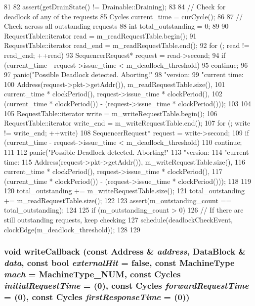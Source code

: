 \begin{DoxyCode}
81 {
82     assert(getDrainState() != Drainable::Draining);
83 
84     // Check for deadlock of any of the requests
85     Cycles current_time = curCycle();
86 
87     // Check across all outstanding requests
88     int total_outstanding = 0;
89 
90     RequestTable::iterator read = m_readRequestTable.begin();
91     RequestTable::iterator read_end = m_readRequestTable.end();
92     for (; read != read_end; ++read) {
93         SequencerRequest* request = read->second;
94         if (current_time - request->issue_time < m_deadlock_threshold)
95             continue;
96 
97         panic("Possible Deadlock detected. Aborting!\n"
98              "version: %
99              "current time: %
100              Address(request->pkt->getAddr()), m_readRequestTable.size(),
101               current_time * clockPeriod(), request->issue_time * clockPeriod(),
102               (current_time * clockPeriod()) - (request->issue_time * 
      clockPeriod()));
103     }
104 
105     RequestTable::iterator write = m_writeRequestTable.begin();
106     RequestTable::iterator write_end = m_writeRequestTable.end();
107     for (; write != write_end; ++write) {
108         SequencerRequest* request = write->second;
109         if (current_time - request->issue_time < m_deadlock_threshold)
110             continue;
111 
112         panic("Possible Deadlock detected. Aborting!\n"
113              "version: %
114              "current time: %
115              Address(request->pkt->getAddr()), m_writeRequestTable.size(),
116               current_time * clockPeriod(), request->issue_time * clockPeriod(),
117               (current_time * clockPeriod()) - (request->issue_time * 
      clockPeriod()));
118     }
119 
120     total_outstanding += m_writeRequestTable.size();
121     total_outstanding += m_readRequestTable.size();
122 
123     assert(m_outstanding_count == total_outstanding);
124 
125     if (m_outstanding_count > 0) {
126         // If there are still outstanding requests, keep checking
127         schedule(deadlockCheckEvent, clockEdge(m_deadlock_threshold));
128     }
129 }
\end{DoxyCode}
\hypertarget{classSequencer_a97f81494e28695a87ea2fdc0346ceb30}{
\subsubsection[{writeCallback}]{\setlength{\rightskip}{0pt plus 5cm}void writeCallback (const {\bf Address} \& {\em address}, \/  {\bf DataBlock} \& {\em data}, \/  const bool {\em externalHit} = {\ttfamily false}, \/  const MachineType {\em mach} = {\ttfamily MachineType\_\-NUM}, \/  const {\bf Cycles} {\em initialRequestTime} = {(0)}, \/  const {\bf Cycles} {\em forwardRequestTime} = {(0)}, \/  const {\bf Cycles} {\em firstResponseTime} = {(0)})}}
\label{classSequencer_a97f81494e28695a87ea2fdc0346ceb30}



